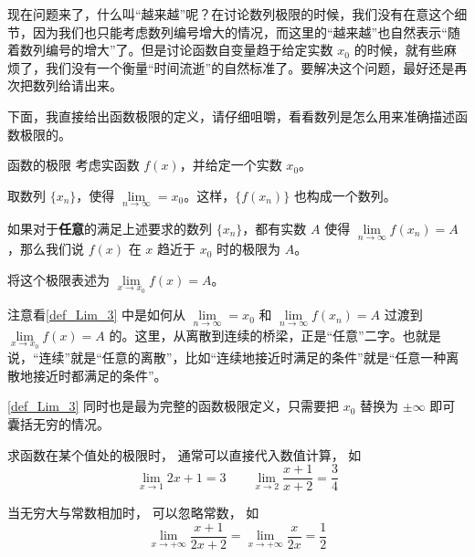 现在问题来了，什么叫“越来越”呢？在讨论数列极限的时候，我们没有在意这个细节，因为我们也只能考虑数列编号增大的情况，而这里的“越来越”也自然表示“随着数列编号的增大”了。但是讨论函数自变量趋于给定实数 $x_0$ 的时候，就有些麻烦了，我们没有一个衡量“时间流逝”的自然标准了。要解决这个问题，最好还是再次把数列给请出来。

下面，我直接给出函数极限的定义，请仔细咀嚼，看看数列是怎么用来准确描述函数极限的。

\begin{definition}{函数的极限}\label{def_Lim_3}
考虑实函数 $f(x)$，并给定一个实数 $x_0$。

取数列 $\{x_n\}$，使得 $\lim\limits_{n\to\infty}=x_0$。这样，$\{f(x_n)\}$ 也构成一个数列。

如果对于\textbf{任意}的满足上述要求的数列 $\{x_n\}$，都有实数 $A$ 使得 $\lim\limits_{n\to\infty}f(x_n)=A$，那么我们说 $f(x)$ 在 $x$ 趋近于 $x_0$ 时的极限为 $A$。

将这个极限表述为 $\lim\limits_{x\to x_0}f(x)=A$。
\end{definition}

注意看\autoref{def_Lim_3} 中是如何从 $\lim\limits_{n\to\infty}=x_0$ 和 $\lim\limits_{n\to\infty}f(x_n)=A$ 过渡到 $\lim\limits_{x\to x_0}f(x)=A$ 的。这里，从离散到连续的桥梁，正是“任意”二字。也就是说，“连续”就是“任意的离散”，比如“连续地接近时满足的条件”就是“任意一种离散地接近时都满足的条件”。

\autoref{def_Lim_3} 同时也是最为完整的函数极限定义，只需要把 $x_0$ 替换为 $\pm\infty$ 即可囊括无穷的情况。



\begin{example}{}
求函数在某个值处的极限时， 通常可以直接代入数值计算， 如
\begin{equation}
\lim_{x\to 1} 2x + 1 = 3 \qquad \lim_{x\to 2}\frac{x + 1}{x + 2} = \frac34
\end{equation}

当无穷大与常数相加时， 可以忽略常数， 如
\begin{equation}
\lim_{x\to +\infty} \frac{x + 1}{2x + 2} = \lim_{x\to +\infty} \frac{x}{2x} = \frac12
\end{equation}
\end{example}

